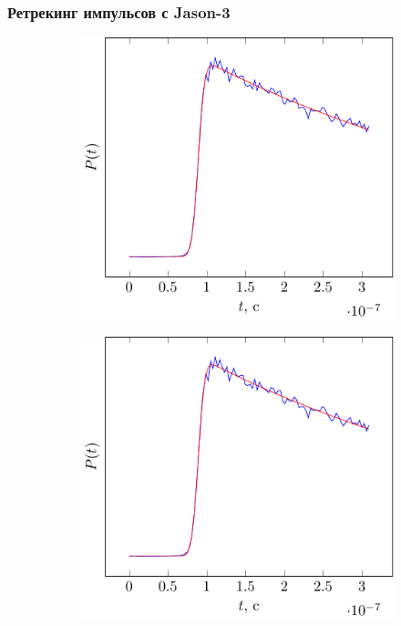 \documentclass[10pt,pdf,hyperref={unicode}, dvipsnames]{beamer}
\begin{document}
\begin{frame}
\frametitle{Ретрекинг импульсов с Jason-3}
\vskip -3pt
\begin{figure}[ht]
    \centering
    \begin{subfigure}{0.42\linewidth}
        \centering
        \includegraphics[width=\linewidth, page=1]{fig/retracking/real}
    \end{subfigure}
    \hfill
    \begin{subfigure}{0.42\linewidth}
        \centering
        \includegraphics[width=\linewidth, page=2]{fig/retracking/real}

\end{subfigure}
\end{figure}
\end{frame}
\end{document}
